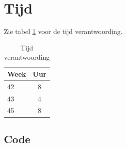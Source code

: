 \documentclass[10pt]{article}
\begin{document}
\section{Tijd}
Zie tabel \ref{tab:time} voor de tijd verantwoording.

\begin{table}[H]
    \begin{center}
        \begin{tabular}{ l c }
            Week & Uur \\ \hline
            42   & 8   \\
            43   & 4   \\
            45   & 8   \\
        \end{tabular}

        \caption{Tijd verantwoording}
        \label{tab:time}
    \end{center}
\end{table}




\newpage
\begin{appendices}
    \section{Code}\label{sec:code}
    
\end{appendices}
\end{document}
